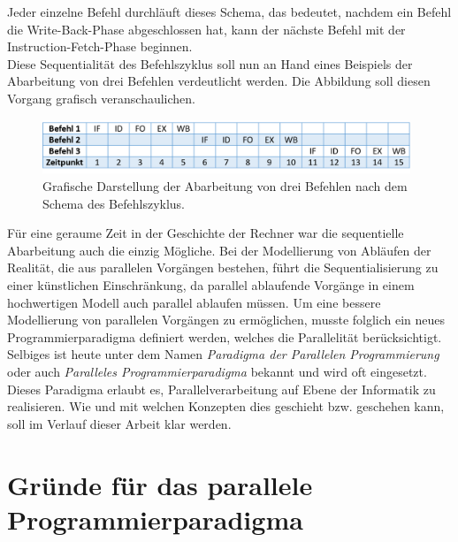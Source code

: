 \begin{description}
						Jeder einzelne Befehl durchläuft dieses Schema, das bedeutet, nachdem ein Befehl die Write-Back-Phase abgeschlossen hat, kann der nächste Befehl mit der Instruction-Fetch-Phase beginnen. \cite{PhasenBefehlsbearbeitung} \cite{FunktionsweiseComputersysteme}\\
						
						Diese Sequentialität des Befehlszyklus soll nun an Hand eines Beispiels der Abarbeitung von drei Befehlen verdeutlicht werden.
						Die Abbildung  soll diesen Vorgang grafisch veranschaulichen.
						
						\begin{figure}
							\centering	
							\includegraphics[width=11cm]{Abbildungen/Befehlszylus_ohne_Pipelining.png}
							\caption{Grafische Darstellung der Abarbeitung von drei Befehlen nach dem Schema des Befehlszyklus.}
							\label{fig:BefehlszylusOhnePipelining}
						\end{figure}
				\end{description}
			
				Für eine geraume Zeit in der Geschichte der Rechner war die sequentielle Abarbeitung auch die einzig Mögliche. Bei der Modellierung von Abläufen der Realität, die aus parallelen Vorgängen bestehen, führt die Sequentialisierung zu einer künstlichen Einschränkung, da parallel ablaufende Vorgänge in einem hochwertigen Modell auch parallel ablaufen müssen.
				Um eine bessere Modellierung von parallelen Vorgängen zu ermöglichen, musste folglich ein neues Programmierparadigma definiert werden, welches die Parallelität berücksichtigt. Selbiges ist heute unter dem Namen \textit{Paradigma der Parallelen Programmierung} oder auch \textit{Paralleles Programmierparadigma} bekannt und wird oft eingesetzt. Dieses Paradigma erlaubt es, Parallelverarbeitung auf Ebene der Informatik zu realisieren. Wie und mit welchen Konzepten dies geschieht bzw. geschehen kann, soll im Verlauf dieser Arbeit klar werden.
				
	\section{Gründe für das parallele Programmierparadigma}
				
